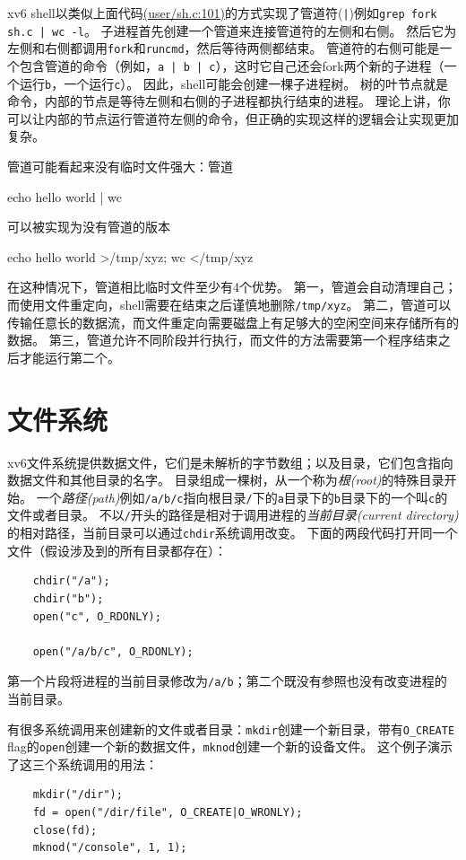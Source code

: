 xv6 shell以类似上面代码\href{https://github.com/mit-pdos/xv6-riscv/blob/risc/user/sh.c#L101}{(user/sh.c:101)}的方式实现了管道符(\texttt{|})例如\texttt{grep fork sh.c | wc -l}。
子进程首先创建一个管道来连接管道符的左侧和右侧。
然后它为左侧和右侧都调用\texttt{fork}和\texttt{runcmd}，然后等待两侧都结束。
管道符的右侧可能是一个包含管道的命令（例如，\texttt{a | b | c}），这时它自己还会fork两个新的子进程（一个运行\texttt{b}，一个运行\texttt{c}）。
因此，shell可能会创建一棵子进程树。
树的叶节点就是命令，内部的节点是等待左侧和右侧的子进程都执行结束的进程。
理论上讲，你可以让内部的节点运行管道符左侧的命令，但正确的实现这样的逻辑会让实现更加复杂。

管道可能看起来没有临时文件强大：管道
\begin{blacklisting}
    echo hello world | wc    
\end{blacklisting}
可以被实现为没有管道的版本
\begin{blacklisting}
    echo hello world >/tmp/xyz; wc </tmp/xyz
\end{blacklisting}

在这种情况下，管道相比临时文件至少有4个优势。
第一，管道会自动清理自己；而使用文件重定向，shell需要在结束之后谨慎地删除\texttt{/tmp/xyz}。
第二，管道可以传输任意长的数据流，而文件重定向需要磁盘上有足够大的空闲空间来存储所有的数据。
第三，管道允许不同阶段并行执行，而文件的方法需要第一个程序结束之后才能运行第二个。

\section{文件系统}
xv6文件系统提供数据文件，它们是未解析的字节数组；以及目录，它们包含指向数据文件和其他目录的名字。
目录组成一棵树，从一个称为\emph{根(root)}的特殊目录开始。
一个\emph{路径(path)}例如\texttt{/a/b/c}指向根目录\texttt{/}下的\texttt{a}目录下的\texttt{b}目录下的一个叫\texttt{c}的文件或者目录。
不以\texttt{/}开头的路径是相对于调用进程的\emph{当前目录(current directory)}的相对路径，当前目录可以通过\texttt{chdir}系统调用改变。
下面的两段代码打开同一个文件（假设涉及到的所有目录都存在）：
\begin{lstlisting}
    chdir("/a");
    chdir("b");
    open("c", O_RDONLY);

    open("/a/b/c", O_RDONLY);
\end{lstlisting}
第一个片段将进程的当前目录修改为\texttt{/a/b}；第二个既没有参照也没有改变进程的当前目录。

有很多系统调用来创建新的文件或者目录：\texttt{mkdir}创建一个新目录，带有\texttt{O\_CREATE} flag的\texttt{open}创建一个新的数据文件，\texttt{mknod}创建一个新的设备文件。
这个例子演示了这三个系统调用的用法：
\begin{lstlisting}
    mkdir("/dir");
    fd = open("/dir/file", O_CREATE|O_WRONLY);
    close(fd);
    mknod("/console", 1, 1);
\end{lstlisting}

